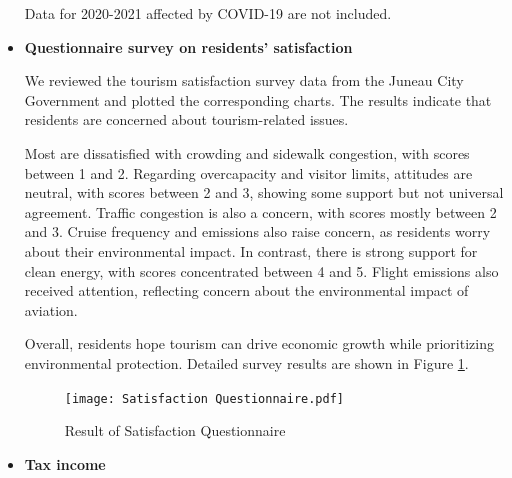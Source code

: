 \documentclass{mcmthesis}
\begin{document}
\begin{itemize}
\begin{table}[htbp]
  \vspace{0.5em}
  {\small\color{NoteColor}\raggedright 
    Data for 2020-2021 affected by COVID-19 are not included.
  }
\end{table}
  \item \textbf{Questionnaire survey on residents' satisfaction}\par
  We reviewed the tourism satisfaction survey data from the Juneau City Government 
  and plotted the corresponding charts. The results indicate that residents are 
  concerned about tourism-related issues.\par Most are dissatisfied with crowding and 
  sidewalk congestion, with scores between 1 and 2. Regarding overcapacity and 
  visitor limits, attitudes are neutral, with scores between 2 and 3, showing some 
  support but not universal agreement. Traffic congestion is also a concern, with 
  scores mostly between 2 and 3. Cruise frequency and emissions also raise concern, 
  as residents worry about their environmental impact. In contrast, there is strong 
  support for clean energy, with scores concentrated between 4 and 5. Flight emissions 
  also received attention, reflecting concern about the environmental impact of 
  aviation.\par Overall, residents hope tourism can drive economic growth while prioritizing 
  environmental protection. Detailed survey results are shown in Figure \ref{fig:satisfy}.
  \begin{figure}[h] 
    \centering
    {\texttt{[image: Satisfaction Questionnaire.pdf]}} %
    \caption{Result of Satisfaction Questionnaire} \label{fig:satisfy}
  \end{figure}
  \item \textbf{Tax income}\par

\end{itemize}
\end{document}
